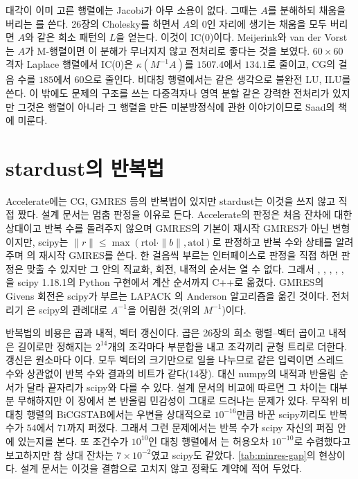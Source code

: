 대각이 이미 고른 행렬에는 Jacobi가 아무 소용이 없다. 그때는 $A$를 분해하되 채움을 버리는 를 쓴다. 26장의 Cholesky를 하면서 $A$의 $0$인 자리에 생기는 채움을 모두 버리면 $A$와 같은 희소 패턴의 $L$을 얻는다. 이것이  IC(0)이다. Meijerink와 van der Vorst는 $A$가 M-행렬이면 이 분해가 무너지지 않고 전처리로 좋다는 것을 보였다\cite{meijerink1977}. $60\times60$ 격자 Laplace 행렬에서 IC(0)은 $\kappa(M^{-1}A)$를 $1507.4$에서 $134.1$로 줄이고, CG의 걸음 수를 $185$에서 $60$으로 줄인다. 비대칭 행렬에서는 같은 생각으로 불완전 LU, ILU를 쓴다. 이 밖에도 문제의 구조를 쓰는 다중격자나 영역 분할 같은 강력한 전처리가 있지만 그것은 행렬이 아니라 그 행렬을 만든 미분방정식에 관한 이야기이므로 Saad의 책\cite{saad2003iterative}에 미룬다.

\section{stardust의 반복법}
\label{sec:krylov-stardust}

\begin{instardust}
Accelerate에는 CG, GMRES 등의 반복법이 있지만 stardust는 이것을 쓰지 않고 직접 짰다. 설계 문서는 멈춤 판정을 이유로 든다. Accelerate의 판정은 처음 잔차에 대한 상대이고 반복 수를 돌려주지 않으며 GMRES의 기본이 재시작 GMRES가 아닌 변형이지만, scipy는 $\|r\|\le\max(\mathrm{rtol}\cdot\|b\|,\mathrm{atol})$로 판정하고 반복 수와 상태를 알려 주며 의 재시작 GMRES를 쓴다. 한 걸음씩 부르는 인터페이스로 판정을 직접 하면 판정은 맞출 수 있지만 그 안의 직교화, 회전, 내적의 순서는 열 수 없다. 그래서 , , , , , 을 scipy 1.18.1의 Python 구현에서 계산 순서까지 C++로 옮겼다. GMRES의 Givens 회전은 scipy가 부르는 LAPACK 의 Anderson 알고리즘을 옮긴 것이다. 전처리기 은 scipy의 관례대로 $A^{-1}$을 어림한 것(위의 $M^{-1}$)이다.
\end{instardust}

\begin{instardust}
반복법의 비용은 곱과 내적, 벡터 갱신이다. 곱은 26장의 희소 행렬--벡터 곱이고 내적은 길이로만 정해지는 $2^{14}$개의 조각마다 부분합을 내고 조각끼리 균형 트리로 더한다. 갱신은 원소마다 이다. 모두 벡터의 크기만으로 일을 나누므로 같은 입력이면 스레드 수와 상관없이 반복 수와 결과의 비트가 같다(14장). 대신 numpy의 내적과 반올림 순서가 달라 끝자리가 scipy와 다를 수 있다. 설계 문서의 비교에 따르면 그 차이는 대부분 무해하지만 이 장에서 본 반올림 민감성이 그대로 드러나는 문제가 있다. 무작위 비대칭 행렬의 BiCGSTAB에서는 우변을 상대적으로 $10^{-16}$만큼 바꾼 scipy끼리도 반복 수가 $54$에서 $71$까지 퍼졌다. 그래서 그런 문제에서는 반복 수가 scipy 자신의 퍼짐 안에 있는지를 본다. 또 조건수가 $10^{10}$인 대칭 행렬에서 는 허용오차 $10^{-10}$로 수렴했다고 보고하지만 참 상대 잔차는 $7\times10^{-2}$였고 scipy도 같았다. \cref{tab:minres-gap}의 현상이다. 설계 문서는 이것을 결함으로 고치지 않고 정확도 계약에 적어 두었다.
\end{instardust}


